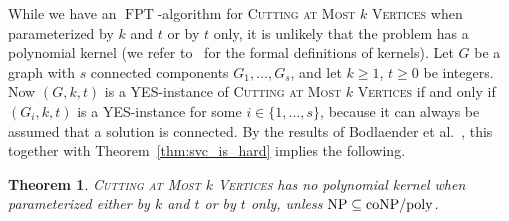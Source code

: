 \documentclass[a4paper,11pt]{article}
\newtheorem{theorem}{Theorem}
\theoremstyle{definition}
\theoremstyle{remark}
\DeclareMathOperator{\operatorClassNP}{NP}
\newcommand{\classNP}{\ensuremath{\operatorClassNP}}
\DeclareMathOperator{\operatorClassFPT}{FPT}
\newcommand{\classFPT}{\ensuremath{\operatorClassFPT}}
\begin{document}
While we have an \classFPT-algorithm for  \textsc{Cutting at Most  $k$ Vertices} when parameterized by $k$ and $t$ or by $t$ only, it is unlikely that the problem has a polynomial kernel (we refer to~\cite{DowneyF99,FlumG06,Niedermeierbook06} for the formal definitions of kernels). Let $G$ be a graph with $s$ connected components $G_1,\ldots,G_s$, and let $k\geq 1$, $t\geq 0$ be integers. Now $(G,k,t)$ is a YES-instance of  \textsc{Cutting at Most  $k$ Vertices} if and only if $(G_i,k,t)$ is a YES-instance for some $i\in\{1,\ldots,s\}$, because 
it can always be assumed that a solution is connected.
By the results of Bodlaender et al.~\cite{BodlaenderDFH09}, this together with Theorem~\ref{thm:svc_is_hard} implies the following.

\begin{theorem}\label{prop:kernel}
 \textsc{Cutting at Most  $k$ Vertices} has no polynomial kernel when parameterized either by $k$ and $t$ or by $t$ only, unless $\classNP\subseteq\text{\rm coNP}/\text{\rm poly}$.
\end{theorem}
\end{document}
